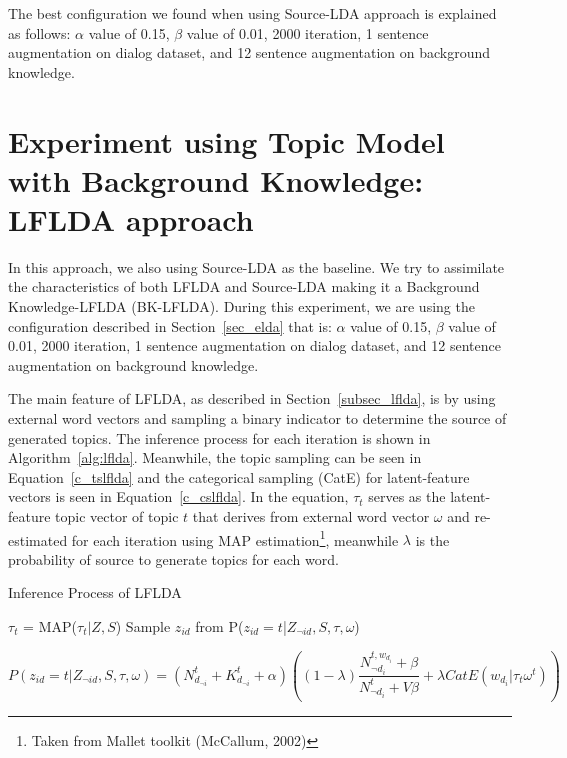 \documentclass[senior]{IPSstyle}
\begin{document}
The best configuration we found when using Source-LDA approach is explained as follows: $\alpha$ value of 0.15, $\beta$ value of 0.01, 2000 iteration, 1 sentence augmentation on dialog dataset, and 12 sentence augmentation on background knowledge.

\section{Experiment using Topic Model with Background Knowledge: LFLDA approach}

In this approach, we also using Source-LDA as the baseline. We try to assimilate the characteristics of both LFLDA and Source-LDA making it a Background Knowledge-LFLDA (BK-LFLDA). During this experiment, we are using the configuration described in Section~\ref{sec_elda} that is: $\alpha$ value of 0.15, $\beta$ value of 0.01, 2000 iteration, 1 sentence augmentation on dialog dataset, and 12 sentence augmentation on background knowledge.

The main feature of LFLDA, as described in Section~\ref{subsec_lflda}, is by using external word vectors and sampling a binary indicator to determine the source of generated topics. The inference process for each iteration is shown in Algorithm~\ref{alg:lflda}. Meanwhile, the topic  sampling can be seen in Equation~\ref{c_tslflda} and the categorical sampling (CatE) for latent-feature vectors is seen in Equation~\ref{c_cslflda}. In the equation, $\tau_t$ serves as the latent-feature topic vector of topic $t$ that derives from external word vector $\omega$ and re-estimated for each iteration using MAP estimation\footnote{Taken from Mallet toolkit (McCallum, 2002)}, meanwhile $\lambda$ is the probability of source to generate topics for each word.

\begin{algorithm}[h]
\caption{Inference Process of LFLDA}
\label{alg:lflda}
\begin{algorithmic}[1]
\State $\tau_t$ = MAP($\tau_t | Z,S$) 
\EndFor
\EndFor
{} 
\State Sample $z_{id}$ from P($z_{id}=t$|$Z_{\neg id},S,\tau,\omega$)
\EndFor
\EndFor
\end{algorithmic}
\end{algorithm}

\begin{equation}
P(z_{id} = t | Z_{\neg id},S,\tau,\omega) = (N^{t}_{d_{\neg i}} + K^{t}_{d_{\neg i}} + \alpha)((1-\lambda)\frac{N^{t,w_{d_i}}_{\neg  d_i}+\beta}{N^{t}_{\neg d_i}+V\beta}+\lambda CatE(w_{d_i}|\tau_t\omega^t))
\label{c_tslflda}
\end{equation}
\end{document}
